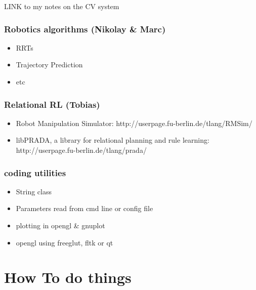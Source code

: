 LINK to my notes on the CV system


\subsubsection{Robotics algorithms (Nikolay \& Marc)}

\begin{itemize}
\item RRTs

\item Trajectory Prediction

\item etc
\end{itemize}



\subsubsection{Relational RL (Tobias)}

\begin{itemize}
\item Robot Manipulation Simulator: http://userpage.fu-berlin.de/tlang/RMSim/

\item libPRADA, a library for relational planning and rule learning: http://userpage.fu-berlin.de/tlang/prada/
\end{itemize}


\subsubsection{coding utilities}

\begin{itemize}
\item String class

\item Parameters read from cmd line or config file

\item plotting in opengl \& gnuplot

\item opengl using freeglut, fltk or qt
\end{itemize}









\section{How To do things}


